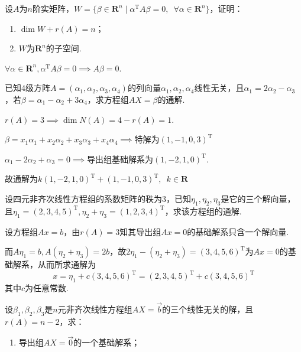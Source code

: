 \begin{exercise}
\begin{exgroup}
        \item 设$A$为$n$阶实矩阵，$W=\{\beta\in\mathbf{R}^n \mid \alpha^\mathrm{T}A\beta=0,\enspace \forall \alpha\in\mathbf{R}^n\}$，证明：
        \begin{enumerate}
            \item $\dim W+r(A)=n$；

            \item $W$为$\mathbf{R}^n$的子空间.
        \end{enumerate}
        \begin{answer}
            $\forall \alpha \in \mathbf{R}^n, \alpha^\mathrm{T}A\beta =0\implies A\beta =0$.
        \end{answer}

        \item 已知4级方阵$A=(\alpha_1,\alpha_2,\alpha_3,\alpha_4)$的列向量$\alpha_1,\alpha_2,\alpha_4$线性无关，且$\alpha_1=2\alpha_2-\alpha_3$，若$\beta=\alpha_1-\alpha_2+3\alpha_4$，求方程组$AX=\beta$的通解.
        \begin{answer}
            $r(A)=3\implies \dim{N(A)}=4-r(A)=1$.

          $\beta = x_1\alpha_1+x_2\alpha_2+x_3\alpha_3+x_4\alpha_4\implies$特解为$(1,-1,0,3)^\mathrm{T}$

          $\alpha_1-2\alpha_2+\alpha_3=0\implies$导出组基础解系为$(1,-2,1,0)^\mathrm{T}$.

          故通解为$k(1,-2,1,0)^\mathrm{T}+(1,-1,0,3)^\mathrm{T},\enspace k\in\mathbf{R}$
        \end{answer}

        \item 设四元非齐次线性方程组的系数矩阵的秩为3，已知$\eta_1,\eta_2,\eta_3$是它的三个解向量，且$\eta_1=(2,3,4,5)^\mathrm{T},\eta_2+\eta_3=(1,2,3,4)^\mathrm{T}$，求该方程组的通解.
        \begin{answer}
            设方程组$Ax=b$，由$r(A)=3$知其导出组$Ax=0$的基础解系只含一个解向量.

          而$A\eta_1=b,A(\eta_2+\eta_3)=2b$，故$2\eta_1-(\eta_2+\eta_3)=(3,4,5,6)^\mathrm{T}$为$Ax=0$的基础解系，从而所求通解为
          \[ x = \eta_1+c(3,4,5,6)^\mathrm{T} = (2,3,4,5)^\mathrm{T} + c(3,4,5,6)^\mathrm{T} \]
          其中$c$为任意常数.
        \end{answer}

        \item 设$\beta_1,\beta_2,\beta_3$是$n$元非齐次线性方程组$AX=\vec{b}$的三个线性无关的解，且$r(A)=n-2$，求：
        \begin{enumerate}
            \item 导出组$AX=\vec{0}$的一个基础解系；


\end{enumerate}
\end{exgroup}
\end{exercise}
